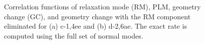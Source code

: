 \begin{figure}[]
\\
\\
\caption{Correlation functions of relaxation mode (RM), PLM, geometry change (GC), and geometry change with the RM component eliminated for (a) c-1,4ee and (b) d-2,6ae. The exact rate is computed using the full set of normal modes.}
\label{Corr}
\end{figure}

